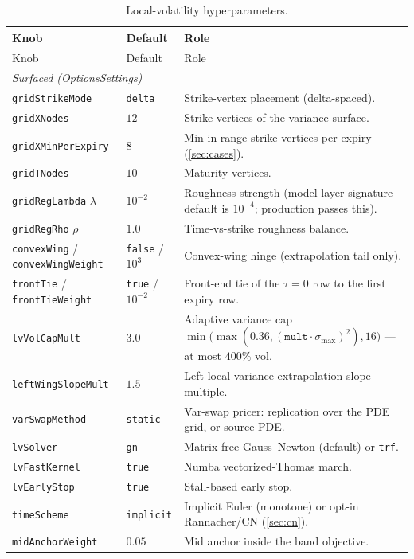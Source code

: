 \documentclass[11pt]{article}
\begin{document}
\begin{longtable}{p{}p{}p{}}
\caption{Local-volatility hyperparameters.}\label{tab:atlas}\\
\toprule Knob & Default & Role\\ \midrule
\endfirsthead \toprule Knob & Default & Role\\ \midrule \endhead
\multicolumn{3}{l}{\emph{Surfaced (OptionsSettings)}}\\ \midrule
\texttt{gridStrikeMode} & \texttt{delta} & Strike-vertex placement
(delta-spaced).\\
\texttt{gridXNodes} & $12$ & Strike vertices of the variance surface.\\
\texttt{gridXMinPerExpiry} & $8$ & Min in-range strike vertices per expiry
(\cref{sec:cases}).\\
\texttt{gridTNodes} & $10$ & Maturity vertices.\\
\texttt{gridRegLambda} $\lambda$ & $10^{-2}$ & Roughness strength
(model-layer signature default is $10^{-4}$; production passes this).\\
\texttt{gridRegRho} $\rho$ & $1.0$ & Time-vs-strike roughness balance.\\
\texttt{convexWing} / \texttt{convexWingWeight} & \texttt{false} / $10^{3}$
& Convex-wing hinge (extrapolation tail only).\\
\texttt{frontTie} / \texttt{frontTieWeight} & \texttt{true} / $10^{-2}$ &
Front-end tie of the $\tau=0$ row to the first expiry row.\\
\texttt{lvVolCapMult} & $3.0$ & Adaptive variance cap
$\min\big(\max(0.36,(\texttt{mult}\cdot\sigma_{\max})^{2}),16\big)$ --- at
most $400\%$ vol.\\
\texttt{leftWingSlopeMult} & $1.5$ & Left local-variance extrapolation
slope multiple.\\
\texttt{varSwapMethod} & \texttt{static} & Var-swap pricer: replication
over the PDE grid, or source-PDE.\\
\texttt{lvSolver} & \texttt{gn} & Matrix-free Gauss--Newton (default) or
\texttt{trf}.\\
\texttt{lvFastKernel} & \texttt{true} & Numba vectorized-Thomas march.\\
\texttt{lvEarlyStop} & \texttt{true} & Stall-based early stop.\\
\texttt{timeScheme} & \texttt{implicit} & Implicit Euler (monotone) or
opt-in Rannacher/CN (\cref{sec:cn}).\\
\texttt{midAnchorWeight} & $0.05$ & Mid anchor inside the band objective.\\

\end{longtable}
\end{document}
